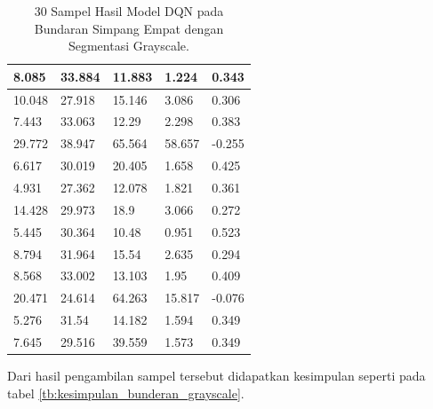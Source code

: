 \begin{table}[H]
{\begin{tabular}{|l|l|l|l|l|}
			8.085           & 33.884     & 11.883           & 1.224           & 0.343       \\ \hline
			10.048          & 27.918     & 15.146           & 3.086           & 0.306       \\ \hline
			7.443           & 33.063     & 12.29            & 2.298           & 0.383       \\ \hline
			29.772          & 38.947     & 65.564           & 58.657          & -0.255      \\ \hline
			6.617           & 30.019     & 20.405           & 1.658           & 0.425       \\ \hline
			4.931           & 27.362     & 12.078           & 1.821           & 0.361       \\ \hline
			14.428          & 29.973     & 18.9             & 3.066           & 0.272       \\ \hline
			5.445           & 30.364     & 10.48            & 0.951           & 0.523       \\ \hline
			8.794           & 31.964     & 15.54            & 2.635           & 0.294       \\ \hline
			8.568           & 33.002     & 13.103           & 1.95            & 0.409       \\ \hline
			20.471          & 24.614     & 64.263           & 15.817          & -0.076      \\ \hline
			5.276           & 31.54      & 14.182           & 1.594           & 0.349       \\ \hline
			7.645           & 29.516     & 39.559           & 1.573           & 0.349       \\ \hline
		\end{tabular}%
	}
	\caption{30 Sampel Hasil Model DQN pada Bundaran Simpang Empat dengan Segmentasi Grayscale.}
	\label{tb:hasilpengujian_bunderan_grayscale}
\end{table}

Dari hasil pengambilan sampel tersebut didapatkan kesimpulan seperti pada tabel \ref{tb:kesimpulan_bunderan_grayscale}.

\begin{table}[H]
	\caption{Kesimpulan Hasil Model DQN pada Bundaran Simpang Empat dengan Segmentasi Grayscale.}
	\label{tb:kesimpulan_bunderan_grayscale}
\end{table}



